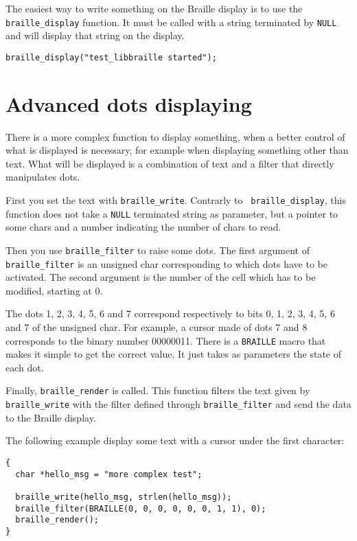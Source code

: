 \documentclass[12pt,a4paper]{article}
\begin{document}
The easiest way to write something on the Braille display is to use
the {\tt braille\_display} function. It must be called with a string
terminated by {\tt NULL} and will display that string on the display.

\begin{verbatim}
braille_display("test_libbraille started");
\end{verbatim}   

\section{Advanced dots displaying}

There is a more complex function to display something, when a better
control of what is displayed is necessary, for example when displaying
something other than text. What will be displayed is a combination of
text and a filter that directly manipulates dots.

First you set the text with {\tt braille\_write}. Contrarly to {\tt
braille\_display}, this function does not take a {\tt NULL}
terminated string as parameter, but a pointer to some chars and a
number indicating the number of chars to read.
   
Then you use {\tt braille\_filter} to raise some dots. The first
argument of {\tt braille\_filter} is an unsigned char corresponding to
which dots have to be activated. The second argument is the number of
the cell which has to be modified, starting at 0.

The dots 1, 2, 3, 4, 5, 6 and 7 correspond respectively to bits 0, 1,
2, 3, 4, 5, 6 and 7 of the unsigned char.  For example, a cursor made
of dots 7 and 8 corresponds to the binary number 00000011. There is a
{\tt BRAILLE} macro that makes it simple to get the correct value. It
just takes as parameters the state of each dot.

Finally, {\tt braille\_render} is called. This function filters the
text given by {\tt braille\_write} with the filter defined through
{\tt braille\_filter} and send the data to the Braille display.

The following example display some text with a cursor under the first
character:
\begin{verbatim}
{  
  char *hello_msg = "more complex test";

  braille_write(hello_msg, strlen(hello_msg)); 
  braille_filter(BRAILLE(0, 0, 0, 0, 0, 0, 1, 1), 0);
  braille_render();
}   
\end{verbatim}
\end{document}
